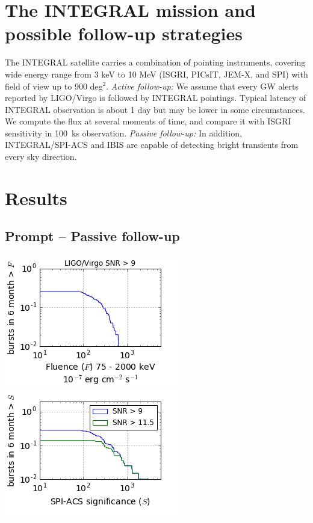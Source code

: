 \documentclass[12pt, a4]{article}
\begin{document}
\section*{The INTEGRAL mission and possible follow-up strategies}


The INTEGRAL satellite carries a combination of pointing instruments, covering
wide energy range from 3 keV to 10 MeV (ISGRI, PICsIT, JEM-X, and SPI) with
field of view up to 900 deg$^2$. \emph{Active follow-up:} We assume that every
GW alerts reported by LIGO/Virgo is followed by INTEGRAL pointings. Typical
latency of INTEGRAL observation is about 1 day but may be lower in some
circumstances. We compute the flux at several moments of time, and compare it
with ISGRI sensitivity in 100~ks observation. \emph{Passive follow-up:} In
addition, INTEGRAL/SPI-ACS and IBIS are capable of detecting bright transients
from every sky direction.

\section*{Results}

\subsection*{Prompt -- Passive follow-up}

\begin{center}
    \includegraphics[scale=.6]{fluence_distribution_9.png}
    \includegraphics[scale=.6]{significance_distribution_9_11_5.png}
  \vspace*{-0.7cm}
    \label{covered_region}
\end{center}
\end{document}
